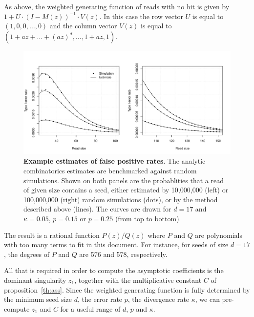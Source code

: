 \documentclass{article}
\begin{document}
As above, the weighted generating function of reads with no hit is given
by $1+U \cdot (I-M(z))^{-1} \cdot V(z)$. In this case the row vector $U$
is equal to $(1,0,0,\ldots,0)$ and the column vector $V(z)$ is equal to
$(1+az+\ldots+(az)^d, \ldots, 1+az, 1)$.


\begin{figure}[h]
\centering
\includegraphics[scale=0.445]{simulp_false_positives.pdf}
\caption{\textbf{Example estimates of false positive rates}. The analytic
combinatorics estimates are benchmarked against random simulations. Shown
on both panels are the probablities that a read of given size contains a
seed, either estimated by 10,000,000 (left) or 100,000,000 (right) random
simulations (dots), or by the method described above (lines). The curves
are drawn for $d=17$ and $\kappa=0.05$, $p=0.15$ or $p=0.25$ (from top to
bottom).}
\label{fig:simulp_fp}
\end{figure}


The result is a rational function
$P(z)/Q(z)$ where $P$ and $Q$ are polynomials with too many terms to fit
in this document. For instance, for seeds of size $d=17$, the degrees of
$P$ and $Q$ are 576 and 578, respectively.

All that is required in order to compute the asymptotic coefficients is
the dominant singularity $z_1$, together with the multiplicative constant
$C$ of proposition~\ref{th:ass}. Since the weighted generating function is
fully determined by the minimum seed size $d$, the error rate $p$, the
divergence rate  $\kappa$, we can pre-compute $z_1$ and $C$ for a useful
range of $d$, $p$ and $\kappa$.
\end{document}
